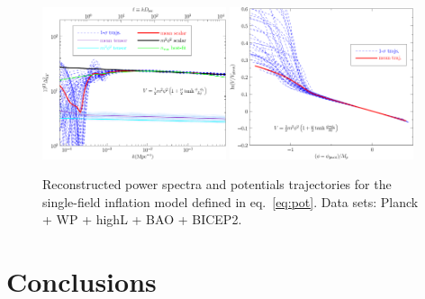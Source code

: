 \documentclass[11pt]{article}
\def \halffigwidth{0.48\textwidth}
\begin{document}
\begin{figure}
\includegraphics[width=\halffigwidth]{bump_power_trajs.pdf}%
\includegraphics[width=\halffigwidth]{bump_potential_trajs.pdf}
\caption{Reconstructed power spectra and potentials trajectories for the single-field inflation model defined in eq.~\eqref{eq:pot}. Data sets: Planck + WP + highL + BAO + BICEP2. \label{fig:traj_model}}
\end{figure}

\section{Conclusions}
\end{document}
